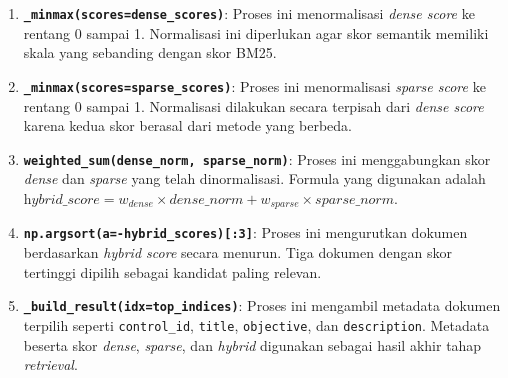 \documentclass[12pt,a4paper]{article}
\begin{document}
\begin{enumerate}[label=\alph*., leftmargin=1.1cm]
\item \textbf{\texttt{\_minmax(scores=dense\_scores)}}: Proses ini menormalisasi \textit{dense score} ke rentang 0 sampai 1. Normalisasi ini diperlukan agar skor semantik memiliki skala yang sebanding dengan skor BM25.

\item \textbf{\texttt{\_minmax(scores=sparse\_scores)}}: Proses ini menormalisasi \textit{sparse score} ke rentang 0 sampai 1. Normalisasi dilakukan secara terpisah dari \textit{dense score} karena kedua skor berasal dari metode yang berbeda.

\item \textbf{\texttt{weighted\_sum(dense\_norm, sparse\_norm)}}: Proses ini menggabungkan skor \textit{dense} dan \textit{sparse} yang telah dinormalisasi. Formula yang digunakan adalah $\textit{hybrid\_score} = w_{\textit{dense}} \times \textit{dense\_norm} + w_{\textit{sparse}} \times \textit{sparse\_norm}$.

\item \textbf{\texttt{np.argsort(a=-hybrid\_scores)[:3]}}: Proses ini mengurutkan dokumen berdasarkan \textit{hybrid score} secara menurun. Tiga dokumen dengan skor tertinggi dipilih sebagai kandidat paling relevan.

\item \textbf{\texttt{\_build\_result(idx=top\_indices)}}: Proses ini mengambil metadata dokumen terpilih seperti \texttt{control\_id}, \texttt{title}, \texttt{objective}, dan \texttt{description}. Metadata beserta skor \textit{dense}, \textit{sparse}, dan \textit{hybrid} digunakan sebagai hasil akhir tahap \textit{retrieval}.
\end{enumerate}
\end{document}

